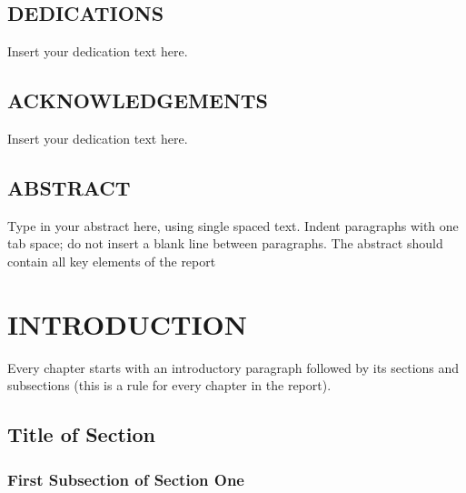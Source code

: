 \documentclass[10pt]{report}
\begin{document}
\newpage																		

\section*{DEDICATIONS}
\label{chapter:DEDICATIONS}
Insert your dedication text here.

\newpage


\newpage

\section*{ACKNOWLEDGEMENTS}
\label{chapter:ACKNOWLEDGEMENTS}
Insert your dedication text here.

\newpage

\section*{ABSTRACT}
\label{chapter:ABSTRACT}
Type in your abstract here, using single spaced text. Indent paragraphs with one tab space; do not insert a blank line between paragraphs. The abstract should contain all key elements of the report

\newpage

\tableofcontents
\newpage

\listoftables

\newpage

\listoffigures

\newpage

\chapter{INTRODUCTION}

Every chapter starts with an introductory paragraph followed by its sections and subsections (this is a rule for every chapter in the report).

\section{Title of Section}
    \subsection{First Subsection of Section One}
\end{document}
